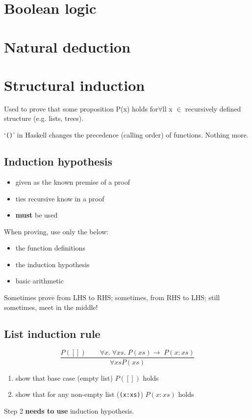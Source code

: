 \documentclass[10pt,a4paper,landscape]{article}
\begin{document}
\pagestyle{empty}
\begin{multicols*}{3}
\section{Boolean logic}

\section{Natural deduction}

\section{Structural induction}
Used to prove that some proposition P(x) holds for$\forall$ll x $\in$ recursively defined structure (e.g. lists, trees).

`\verb|()|' in Haskell changes the precedence (calling order) of functions. Nothing more.
\subsection*{Induction hypothesis}
\begin{itemize}
\item given as the known premise of a proof
\item ties recursive know in a proof
\item \textbf{must} be used
\end{itemize}
When proving, use only the below:
\begin{itemize}
\item the function definitions
\item the induction hypothesis
\item basic arithmetic
\end{itemize}
Sometimes prove from LHS to RHS; sometimes, from RHS to LHS; still sometimes, meet in the middle!
\subsection*{List induction rule}
\begin{displaymath}
\frac{P([])\qquad \forall x.\; \forall xs.\; P(xs) \rightarrow\; P(x:xs)}{\forall xs P(xs)}
\end{displaymath}
\begin{enumerate}
\item show that base case (empty list) $P([])$ holds
\item show that for any non-empty list (\verb|(x:xs)|) $P(x:xs)$ holds
\end{enumerate}
Step 2 \textbf{needs to use} induction hypothesis.


\end{multicols*}
\end{document}
